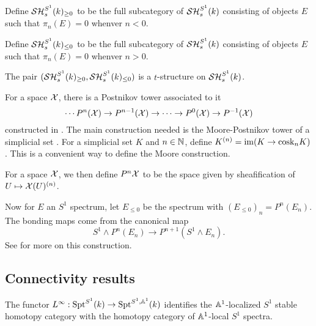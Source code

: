 \documentclass{amsart}%
\newcommand{\cosk}{\mathrm{cosk}}
\begin{document}
\begin{definition}%
  Define $\mathcal{SH}_s^{S^1}(k)_{\geq 0}$ to be the full subcategory of
  $\mathcal{SH}_s^{S^1}(k)$ consisting of objects $E$ such that $\pi_n(E)=0$
  whenver $n<0$.
  
  Define $\mathcal{SH}_s^{S^1}(k)_{\leq 0}$ to be the full subcategory of
  $\mathcal{SH}_s^{S^1}(k)$ consisting of objects $E$ such that $\pi_n(E)=0$
  whenver $n>0$.
\end{definition}

\begin{theorem}
  The pair $(\mathcal{SH}_s^{S^1}(k)_{\geq 0}, \mathcal{SH}_s^{S^1}(k)_{\leq 0})$ is a
  $t$-structure on $\mathcal{SH}_s^{S^1}(k)$.
\end{theorem}


\begin{remark}
  For a space $\mathcal{X}$, there is a Postnikov tower associated to it
  \begin{equation*}
    \cdots P^n(\mathcal{X})\to P^{n-1}(\mathcal{X}) \to \cdots \to P^{0}(\mathcal{X}) \to P^{-1}(\mathcal{X})
  \end{equation*}
  constructed in \cite[p. 57]{MV99}. The main construction needed is the
  Moore-Postnikov tower of a simplicial set \cite[VI.3.4]{GJ91}. For a
  simplicial set $K$ and $n\in\mathbb{N}$, define
  $K^{(n)} = \im ( K \to \cosk_nK)$. This is a convenient way to
  define the Moore construction. 

  For a space $\mathcal{X}$, we then define $P^{n}\mathcal{X}$ to be the space
  given by sheafification of $U \mapsto \mathcal{X}(U)^{(n)}$.

  Now for $E$ an $S^1$ spectrum, let $E_{\leq 0}$ be the spectrum with
  $(E_{\leq 0})_n = P^n(E_n)$. The bonding maps come from the
  canonical map
  \begin{equation*}
    S^1 \wedge P^n(E_n) \to P^{n+1}(S^1 \wedge E_n).
  \end{equation*}
  See \cite[Lemma 3.2.1]{Mor05} for more on this construction.
\end{remark}

\subsection{Connectivity results}

\begin{proposition}\cite[Lemma4.2.4]{Mor03}
  The functor
  $L^{\infty} : \mathrm{Spt}^{S^1}(k) \to \mathrm{Spt}^{S^1,\mathbb{A}^1}(k)$
  identifies the $\mathbb{A}^1$-localized $S^1$ stable homotopy category
  with the homotopy category of $\mathbb{A}^1$-local $S^1$ spectra.
\end{proposition}
\end{document}
